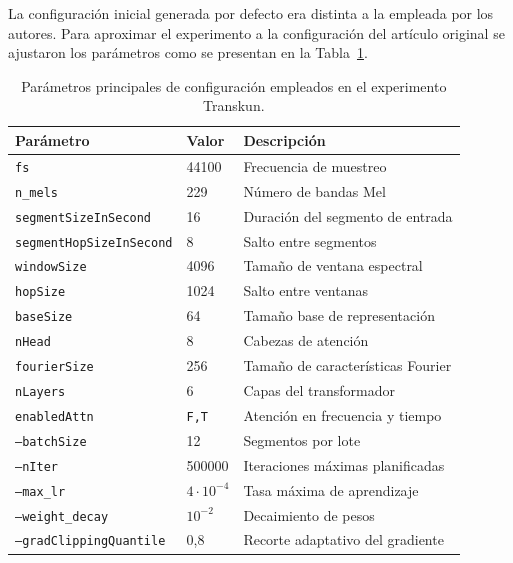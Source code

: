 \documentclass[11pt,spanish,listoffigures,listoftables]{tfgetsinf}
\begin{document}
La configuración inicial generada por defecto era distinta a la empleada
por los autores. Para aproximar el experimento a la configuración del artículo
original se ajustaron los parámetros como se presentan en la Tabla~\ref{tab:transkun_config}.

\begin{table}[H]
  \centering
  \caption[Parámetros principales de configuración establecidos para el entrenamiento de Transkun]{Parámetros principales de configuración empleados en el experimento
  Transkun.}
  \label{tab:transkun_config}
  \begin{tabular}{lll}
    \hline
    \textbf{Parámetro} & \textbf{Valor} & \textbf{Descripción} \\
    \hline
    \texttt{fs}                         & 44100 & Frecuencia de muestreo \\
    \texttt{n\_mels}                    & 229   & Número de bandas Mel \\
    \texttt{segmentSizeInSecond}        & 16    & Duración del segmento de entrada \\
    \texttt{segmentHopSizeInSecond}     & 8     & Salto entre segmentos \\
    \texttt{windowSize}                 & 4096  & Tamaño de ventana espectral \\
    \texttt{hopSize}                    & 1024  & Salto entre ventanas \\
    \texttt{baseSize}                   & 64    & Tamaño base de representación \\
    \texttt{nHead}                      & 8     & Cabezas de atención \\
    \texttt{fourierSize}                & 256   & Tamaño de características Fourier \\
    \texttt{nLayers}                    & 6     & Capas del transformador \\
    \texttt{enabledAttn}                & \texttt{F,T} & Atención en frecuencia y tiempo \\
    \texttt{--batchSize}                & 12    & Segmentos por lote \\
    \texttt{--nIter}                    & 500000 & Iteraciones máximas planificadas \\
    \texttt{--max\_lr}                  & $4\cdot10^{-4}$ & Tasa máxima de aprendizaje \\
    \texttt{--weight\_decay}            & $10^{-2}$ & Decaimiento de pesos \\
    \texttt{--gradClippingQuantile}     & 0{,}8 & Recorte adaptativo del gradiente \\
    \hline
  \end{tabular}
\end{table}
\end{document}
